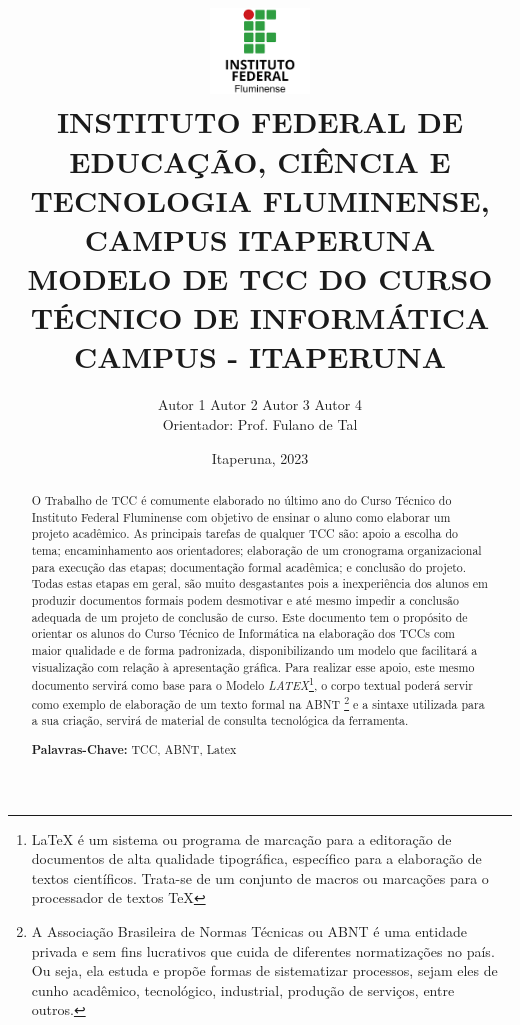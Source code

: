 \documentclass[a4paper,12pt]{article}
\title{
    \includegraphics[width=100px]{logo/logo.png}\\\large
    INSTITUTO FEDERAL DE EDUCAÇÃO, CIÊNCIA E TECNOLOGIA FLUMINENSE, CAMPUS ITAPERUNA\\\large
    MODELO DE TCC DO CURSO TÉCNICO DE INFORMÁTICA CAMPUS - ITAPERUNA
 }
\author{
Autor 1 \qquad 
Autor 2 \qquad
Autor 3 \qquad
Autor 4 \\
Orientador: Prof. Fulano de Tal
}
\date{\small Itaperuna, 2023}
\begin{document}
\maketitle
\begin{abstract}
\begin{spacing}{1}
\noindent 
O Trabalho de TCC é comumente elaborado no último ano do Curso Técnico do Instituto Federal Fluminense com objetivo de ensinar o aluno como elaborar um projeto acadêmico. As principais tarefas de qualquer TCC são: apoio a escolha do tema; encaminhamento aos orientadores; elaboração de um cronograma organizacional para execução das etapas; documentação formal acadêmica; e conclusão do projeto. Todas estas etapas em geral, são muito desgastantes pois a inexperiência dos alunos em produzir documentos formais podem desmotivar e até mesmo impedir a conclusão adequada de um projeto de conclusão de curso. Este documento tem o propósito de orientar os alunos do Curso Técnico de Informática na elaboração dos TCCs com maior qualidade e de forma padronizada, disponibilizando um modelo que facilitará a visualização com relação à apresentação gráfica. Para realizar esse apoio, este mesmo documento servirá como base para o Modelo \textit{LATEX}\footnote{LaTeX é um sistema ou programa de marcação para a editoração de documentos de alta qualidade tipográfica, específico para a elaboração de textos científicos. Trata-se de um conjunto de macros ou marcações para o processador de textos TeX}, o corpo textual poderá servir como exemplo de elaboração de um texto formal na ABNT \footnote{A Associação Brasileira de Normas Técnicas ou ABNT é uma entidade privada e sem fins lucrativos que cuida de diferentes normatizações no país. Ou seja, ela estuda e propõe formas de sistematizar processos, sejam eles de cunho acadêmico, tecnológico, industrial, produção de serviços, entre outros.} 
e a sintaxe utilizada para a sua criação, servirá de material de consulta tecnológica da ferramenta.

\noindent\textbf{Palavras-Chave:}
TCC, ABNT, Latex
\end{spacing}
\end{abstract}
\newpage

\end{document}
